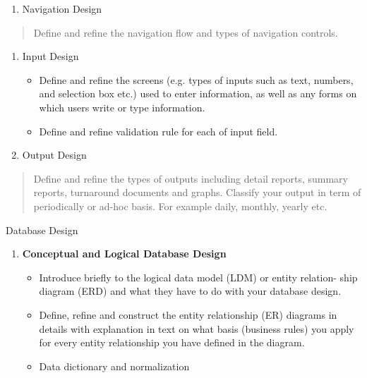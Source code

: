 \documentclass[12pt,a4paper]{article}
\begin{document}
\begin{enumerate}
\def\labelenumi{\alph{enumi}.}
\item
  Navigation Design
\end{enumerate}

\begin{quote}
Define and refine the navigation flow and types of navigation controls.
\end{quote}

\begin{enumerate}
\def\labelenumi{\alph{enumi}.}
\setcounter{enumi}{1}
\item
  Input Design

  \begin{itemize}
  \item
    Define and refine the screens (e.g. types of inputs such as text,
    numbers, and selection box etc.) used to enter information, as well
    as any forms on which users write or type information.
  \item
    Define and refine validation rule for each of input field.
  \end{itemize}
\item
  Output Design
\end{enumerate}

\begin{quote}
Define and refine the types of outputs including detail reports, summary
reports, turnaround documents and graphs. Classify your output in term
of periodically or ad-hoc basis. For example daily, monthly, yearly etc.
\end{quote}

Database Design

\begin{enumerate}
\def\labelenumi{\arabic{enumi}.}
\item
  \textbf{Conceptual and Logical Database Design}

  \begin{itemize}
  \item
    Introduce briefly to the logical data model (LDM) or entity
    relation- ship diagram (ERD) and what they have to do with your
    database design.
  \item
    Define, refine and construct the entity relationship (ER) diagrams
    in details with explanation in text on what basis (business rules)
    you apply for every entity relationship you have defined in the
    diagram.
  \item
    Data dictionary and normalization
  \end{itemize}
\end{enumerate}
\end{document}
